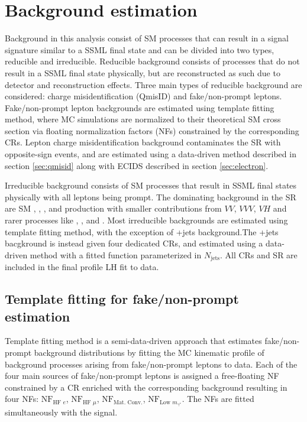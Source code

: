 \documentclass[../thesis.tex]{subfiles}
\begin{document}
\section{Background estimation}
\label{sec:bg}
Background in this analysis consist of \acs{SM} processes that can result in a signal signature similar to a \tttt \acs{SSML} final state and can be divided into two types, reducible and irreducible. Reducible background consists of processes that do not result in a \acs{SSML} final state physically, but are reconstructed as such due to detector and reconstruction effects. Three main types of reducible background are considered: charge misidentification (\acs{QmisID}) and fake/non-prompt leptons. Fake/non-prompt lepton backgrounds are estimated using template fitting method, where \acs{MC} simulations are normalized to their theoretical \acs{SM} cross section via floating normalization factors (\acs{NF}s) constrained by the corresponding \acs{CR}s. Lepton charge misidentification background contaminates the \acs{SR} with opposite-sign events, and are estimated using a data-driven method described in section \ref{sec:qmisid} along with \acs{ECIDS} described in section \ref{sec:electron}.

Irreducible background consists of \acs{SM} processes that result in \acs{SSML} final states physically with all leptons being prompt. The dominating background in the \acs{SR} are \acs{SM} \tttt, \ttW, \ttZ, and \ttH production with smaller contributions from $VV$, $VVV$, $VH$ and rarer processes like \ttVV, \tWZ, \tZq and \ttt. Most irreducible backgrounds are estimated using template fitting method, with the exception of \ttW+jets background.The \ttW+jets bacgkround is instead given four dedicated \acs{CR}s, and estimated using a data-driven method with a fitted function parameterized in $N_\mathrm{jets}$. All \acs{CR}s and \acs{SR} are included in the final profile \acs{LH} fit to data.

\subsection{Template fitting for fake/non-prompt estimation}
\label{sec:template}
Template fitting method is a semi-data-driven approach \citep{bg:ttH_ttW_ML} that estimates fake/non-prompt background distributions by fitting the \acs{MC} kinematic profile of background processes arising from fake/non-prompt leptons to data. Each of the four main sources of fake/non-prompt leptons is assigned a free-floating \acs{NF} constrained by a \acs{CR} enriched with the corresponding background resulting in four \acs{NF}s: $\mathrm{NF}_{\text{HF }e}$, $\mathrm{NF}_{\text{HF }\mu}$, $\mathrm{NF}_{\text{Mat. Conv.}}$, $\mathrm{NF}_{\text{Low }m_{\gamma^{*}}}$. The \acs{NF}s are fitted simultaneously with the signal.
\end{document}
